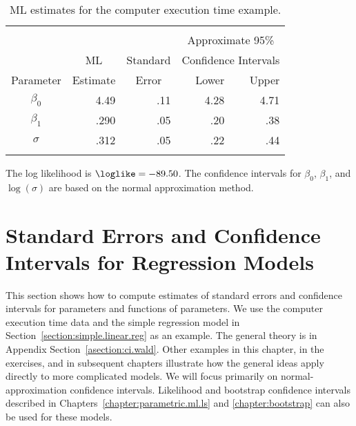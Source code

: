\begin{table}
\caption{ML estimates for the computer execution time example.}
\centering\small
\begin{tabular}{crrrr} \hline
\\[-.5ex]
 & & & \multicolumn{2}{c}{Approximate 95\%}\\
&\multicolumn{1}{c}{ML} &Standard  & \multicolumn{2}{c}{Confidence
Intervals}\\ \cline{4-5}
Parameter &  Estimate & \multicolumn{1}{c}{Error} & Lower & Upper \\
\hline 
 $\beta_{0} $ &4.49 &.11 &4.28 &4.71 \\[.7ex] 
$\beta_{1}$ &.290 &.05 &.20 &.38 \\[.7ex] 
$\sigma$ &.312 &.05 &.22 &.44\\
\hline
\\[-1.8ex]
\end{tabular}
\begin{minipage}[t]{4in}
The log likelihood is $\loglike= -89.50$.  The confidence intervals for
$\beta_0$, $\beta_1$, and $\log(\sigma)$ are based on the normal
approximation method.
\end{minipage}
\label{table:comptime.mles}
\end{table} 

\section{Standard Errors and Confidence Intervals for Regression Models}
\label{section:regr.ci}
This section shows how to compute estimates of standard errors and
confidence intervals for parameters and functions of parameters. We
use the computer execution time data and the simple regression model
in Section~\ref{section:simple.linear.reg} as an example. The general
theory is in Appendix Section~\ref{asection:ci.wald}.  Other examples in this
chapter, in the exercises, and in subsequent chapters illustrate how the
general ideas apply directly to more complicated models.  We will
focus primarily on normal-approximation confidence intervals.
Likelihood and bootstrap confidence intervals described in
Chapters~\ref{chapter:parametric.ml.ls} and \ref{chapter:bootstrap}
can also be used for these models.

